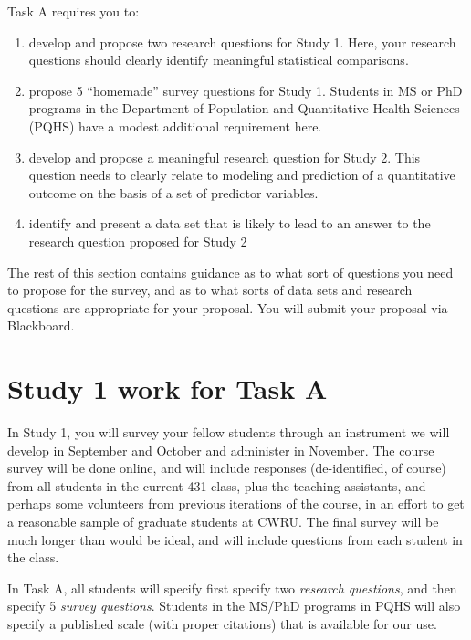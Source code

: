 \documentclass[]{book}
\providecommand{\tightlist}{%
  \setlength{\itemsep}{0pt}\setlength{\parskip}{0pt}}
\theoremstyle{definition}
\theoremstyle{definition}
\theoremstyle{definition}
\theoremstyle{remark}
\begin{document}
Task A requires you to:

\begin{enumerate}
\def\labelenumi{\arabic{enumi}.}
\tightlist
\item
  develop and propose two research questions for Study 1. Here, your
  research questions should clearly identify meaningful statistical
  comparisons.
\item
  propose 5 ``homemade'' survey questions for Study 1. Students in MS or
  PhD programs in the Department of Population and Quantitative Health
  Sciences (PQHS) have a modest additional requirement here.
\item
  develop and propose a meaningful research question for Study 2. This
  question needs to clearly relate to modeling and prediction of a
  quantitative outcome on the basis of a set of predictor variables.
\item
  identify and present a data set that is likely to lead to an answer to
  the research question proposed for Study 2
\end{enumerate}

The rest of this section contains guidance as to what sort of questions
you need to propose for the survey, and as to what sorts of data sets
and research questions are appropriate for your proposal. You will
submit your proposal via Blackboard.

\hypertarget{study-1-work-for-task-a}{%
\section{Study 1 work for Task A}\label{study-1-work-for-task-a}}

In Study 1, you will survey your fellow students through an instrument
we will develop in September and October and administer in November. The
course survey will be done online, and will include responses
(de-identified, of course) from all students in the current 431 class,
plus the teaching assistants, and perhaps some volunteers from previous
iterations of the course, in an effort to get a reasonable sample of
graduate students at CWRU. The final survey will be much longer than
would be ideal, and will include questions from each student in the
class.

In Task A, all students will specify first specify two \emph{research
questions}, and then specify 5 \emph{survey questions}. Students in the
MS/PhD programs in PQHS will also specify a published scale (with proper
citations) that is available for our use.
\end{document}
